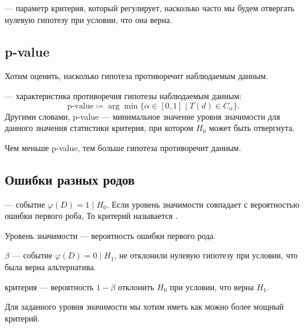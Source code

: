 \documentclass[11pt]{book}
\begin{document}
\begin{definition}[]
	 --- параметр критерия, который регулирует, насколько часто мы будем отвергать нулевую гипотезу при условии, что она верна.
\end{definition}

\subsection{p-value}
Хотим оценить, насколько гипотеза противоречит наблюдаемым данным.
\begin{definition}[]
	 --- характеристика противоречия гипотезы наблюдаемым данным:
	\[
	\text{p-value} \coloneqq \arg \min \{\alpha \in [0, 1] \mid T(d) \in C_{\alpha}\}
	.\] 
	Другими словами, p-value --- минимальное значение уровня значимости для данного значения статистики критерия, при котором $H_0$ может быть отвергнута.

	Чем меньше p-value, тем больше гипотеза противоречит данным.
\end{definition}
\subsection{Ошибки разных родов}
\begin{definition}[]
	 --- событие $\varphi(D) = 1 \mid H_{0}$.
	Если уровень значимости совпадает с вероятностью ошибки первого роба, То критерий называется .
\end{definition}
Уровень значимости --- вероятность ошибки первого рода.

\begin{definition}[]
	 $\beta$ --- событие $\varphi(D) = 0 \mid H_{1}$, не отклонили нулевую гипотезу при условии, что была верна альтернатива.

	 критерия --- вероятность $1 - \beta$ отклонить $H_0$ при условии, что верна $H_1$.
\end{definition}
Для заданного уровня значимости мы хотим иметь как можно более мощный критерий.
\end{document}
